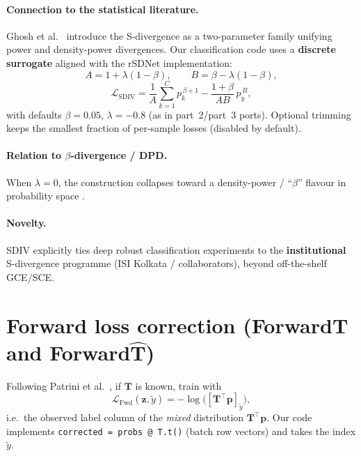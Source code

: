 \documentclass[11pt,a4paper]{article}
\begin{document}
\paragraph{Connection to the statistical literature.}
Ghosh et al.\ \cite{ghosh2017bern} introduce the S-divergence as a two-parameter family unifying power and density-power divergences. Our classification code uses a \textbf{discrete surrogate} aligned with the rSDNet implementation:
\begin{equation}
  A = 1 + \lambda(1-\beta), \qquad B = \beta - \lambda(1-\beta),
\end{equation}
\begin{equation}
  \mathcal{L}_{\mathrm{SDIV}} = \frac{1}{A}\sum_{k=1}^C p_k^{\, \beta+1} - \frac{1+\beta}{A B}\, p_y^{\, B},
\end{equation}
with defaults $\beta = 0.05$, $\lambda = -0.8$ (as in part~2/part~3 ports). Optional trimming keeps the smallest fraction of per-sample losses (disabled by default).

\paragraph{Relation to $\beta$-divergence / DPD.}
When $\lambda=0$, the construction collapses toward a density-power / ``$\beta$'' flavour in probability space \cite{ghosh2017bern}.

\paragraph{Novelty.}
SDIV explicitly ties deep robust classification experiments to the \textbf{institutional} S-divergence programme (ISI Kolkata / collaborators), beyond off-the-shelf GCE/SCE.

\section{Forward loss correction (ForwardT and Forward$\hat{\mathbf{T}}$)}
\label{sec:forward}

Following Patrini et al.\ \cite{patrini2017}, if $\mathbf{T}$ is known, train with
\begin{equation}
  \mathcal{L}_{\mathrm{Fwd}}(\mathbf{z}, \tilde{y}) = -\log \big([\mathbf{T}^\top \mathbf{p}]_{\tilde{y}}\big),
\end{equation}
i.e.\ the observed label column of the \emph{mixed} distribution $\mathbf{T}^\top \mathbf{p}$. Our code implements \texttt{corrected = probs @ T.t()} (batch row vectors) and takes the index $\tilde{y}$.
\end{document}
